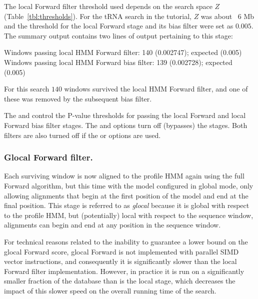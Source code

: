 The local Forward filter threshold used depends on
the search space $Z$ (Table~\ref{tbl:thresholds}). For the tRNA search
in the tutorial, $Z$ was about ~$6$ Mb and the threshold for the local
Forward stage and its bias filter were set as $0.005$. The summary
output contains two lines of output pertaining to this stage:

\begin{sreoutput}
Windows   passing  local HMM Forward       filter:             140  (0.002747); expected (0.005)
Windows   passing  local HMM Forward  bias filter:             139  (0.002728); expected (0.005)
\end{sreoutput}

For this search $140$ windows survived the local HMM Forward filter,
and one of these was removed by the subsequent bias filter. 

The  and  control the P-value thresholds for
passing the local Forward and local Forward bias filter stages.  The
 and  options turn off (bypasses) the
stages. Both filters are also turned off if the  or
 options are used.

\subsubsection{Glocal Forward filter.}

Each surviving window is now aligned to the profile HMM again using the full
Forward algorithm, but this time with the model configured in global
mode, only allowing alignments that begin at the first position of the
model and end at the final position. This stage is referred to as
\emph{glocal} because it is global with respect to the profile HMM,
but (potentially) local with respect to the sequence window,
alignments can begin and end at any position in the sequence
window. 

For technical reasons related to the inability to guarantee a lower
bound on the glocal Forward score, glocal Forward is not implemented
with parallel SIMD vector instructions, and consequently it is
significantly slower than the local Forward filter
implementation. However, in practice it is run on a significantly
smaller fraction of the database than is the local stage, which
decreases the impact of this slower speed on the overall running time
of the search. 

